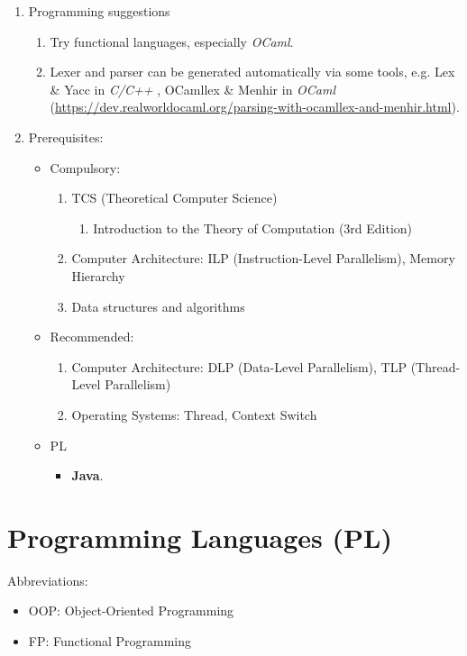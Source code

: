 \documentclass{article}
\begin{document}
\begin{enumerate}
    \item Programming suggestions
    \begin{enumerate}
        \item Try functional languages, especially \emph{OCaml}.
        \item Lexer and parser can be generated automatically  via some tools, e.g. Lex \& Yacc in \emph{C/C++} \cite{levine1992lex}, OCamllex \& Menhir in  \emph{OCaml} (\href{https://dev.realworldocaml.org/parsing-with-ocamllex-and-menhir.html}{https://dev.realworldocaml.org/parsing-with-ocamllex-and-menhir.html}).
    \end{enumerate}
    

    \item Prerequisites:
    \begin{itemize}
        \item Compulsory:
        \begin{enumerate}
        \item TCS (Theoretical Computer Science)
        \begin{enumerate}
            \item Introduction to the Theory of Computation (3rd Edition) \cite{sipser1996introduction}
        \end{enumerate}
        \item Computer Architecture: ILP (Instruction-Level Parallelism), Memory Hierarchy
        \item Data structures and algorithms
    \end{enumerate}
        \item Recommended:
        \begin{enumerate}
            \item Computer Architecture: DLP (Data-Level Parallelism), TLP (Thread-Level Parallelism)
            \item Operating Systems: Thread, Context Switch
        \end{enumerate}
        \item PL
        \begin{itemize}
            \item \textbf{Java}.
        \end{itemize}
    \end{itemize}
\end{enumerate}

\section{Programming Languages (PL)}
Abbreviations:
\begin{itemize}
    \item OOP: Object-Oriented Programming
    \item FP: Functional Programming
\end{itemize}
\end{document}
